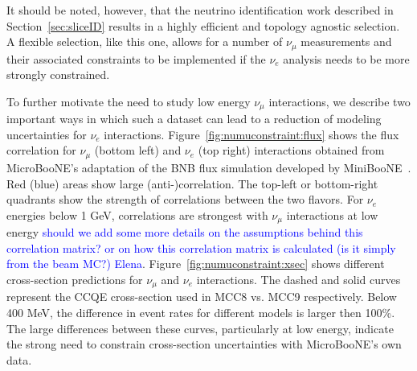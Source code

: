 It should be noted, however, that the neutrino identification work described in Section~\ref{sec:sliceID} results in a highly efficient and topology agnostic selection. A flexible selection, like this one, allows for a number of $\nu_{\mu}$ measurements and their associated constraints to be implemented if the $\nu_e$ analysis needs to be more strongly constrained. 



\par To further motivate the need to study low energy $\nu_{\mu}$ interactions, we describe two important ways in which such a dataset can lead to a reduction of modeling uncertainties for $\nu_e$ interactions. Figure~\ref{fig:numuconstraint:flux} shows the flux correlation for $\nu_{\mu}$ (bottom left) and $\nu_e$ (top right) interactions obtained from MicroBooNE's adaptation of the BNB flux simulation developed by MiniBooNE~\cite{bib:fluxmcc9,bib:fluxtechnote}. Red (blue) areas show large (anti-)correlation. The top-left or bottom-right quadrants show the strength of correlations between the two flavors. For $\nu_e$ energies below 1 GeV, correlations are strongest with $\nu_{\mu}$ interactions at low energy \textcolor{blue}{should we add some more details on the assumptions behind this correlation matrix? or on how this correlation matrix is calculated (is it simply from the beam MC?) Elena}. Figure~\ref{fig:numuconstraint:xsec} shows different cross-section predictions for $\nu_{\mu}$ and $\nu_e$ interactions. The dashed and solid curves represent the CCQE cross-section used in MCC8 vs. MCC9 respectively. Below 400 MeV, the difference in event rates for different models is larger then 100\%. The large differences between these curves, particularly at low energy, indicate the strong need to constrain cross-section uncertainties with MicroBooNE's own data. 
